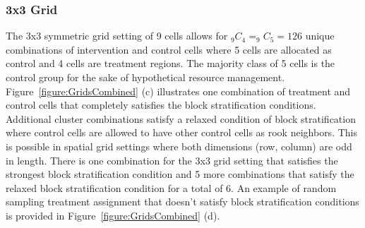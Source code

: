 \documentclass{article}[11pt]
\begin{document}
\subsubsection{3x3 Grid}

The 3x3 symmetric grid setting of 9 cells allows for %
$_{9}C_{4}=_{9}C_{5}=126$ unique combinations of intervention and control cells where 5 cells are allocated as control and 4 cells are treatment regions. The majority class of 5 cells is the control group for the sake of hypothetical resource management. Figure~\ref{figure:GridsCombined} (c) illustrates one combination of treatment and control cells that completely satisfies the block stratification conditions. Additional cluster combinations satisfy a relaxed condition of block stratification where control cells are allowed to have other control cells as rook neighbors. This is possible in spatial grid settings where both dimensions (row, column) are odd in length. There is one combination for the 3x3 grid setting that satisfies the strongest block stratification condition and 5 more combinations that satisfy the relaxed block stratification condition for a total of 6. An example of random sampling treatment assignment that doesn't satisfy block stratification conditions is provided in Figure~\ref{figure:GridsCombined} (d).


\end{document}
